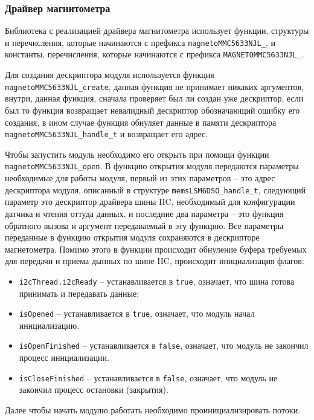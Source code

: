 \subsubsection{Драйвер магнитометра}

Библиотека с реализацией драйвера магнитометра использует функции, структуры и перечисления,
которые начинаются с префикса \lstinline{magnetoMMC5633NJL_}, и константы, перечисления, которые начинаются с префикса \lstinline{MAGNETOMMC5633NJL_}.

Для создания дескриптора модуля используется функция
\lstinline{magnetoMMC5633NJL_create}, данная функция не принимает никаких аргументов, внутри, данная функция, сначала проверяет
был ли создан уже дескриптор, если был то функция возвращает невалидный дескриптор обозначающий ошибку его создания, в ином случае
функция обнуляет данные в памяти дескриптора \lstinline{magnetoMMC5633NJL_handle_t} и возвращает его адрес. 

Чтобы запустить модуль необходимо его открыть при помощи функции
\lstinline{magnetoMMC5633NJL_open}. В функцию открытия модуля передаются параметры необходимые для работы модуля, первый из этих параметров
 -- это адрес дескриптора модуля, описанный в структуре \lstinline{memsLSM6DSO_handle_t}, следующий параметр это дескриптор драйвера шины IIC, необходимый для конфигурации датчика и чтения оттуда данных, и последние два параметра --
это функция обратного вызова и аргумент передаваемый в эту функцию. Все параметры переданные в функцию открытия модуля сохраняются в дескрипторе магнетометра.
Помимо этого в функции происходит обнуление буфера требуемых для передачи и приема дынных по шине IIC, происходит инициализация флагов:

\begin{itemize}
    \item \lstinline{i2cThread.i2cReady} -- устанавливается в \lstinline{true}, означает, что шина готова принимать и передавать данные;
    \item \lstinline{isOpened} -- устанавливается в \lstinline{true}, означает, что модуль начал инициализацию.
    \item \lstinline{isOpenFinished} -- устанавливается в \lstinline{false}, означает, что модуль не закончил процесс инициализации.
    \item \lstinline{isCloseFinished} -- устанавливается в \lstinline{false}, означает, что модуль не закончил процесс остановки (закрытия).
\end{itemize}

Далее чтобы начать модулю работать необходимо проинициализировать потоки:


